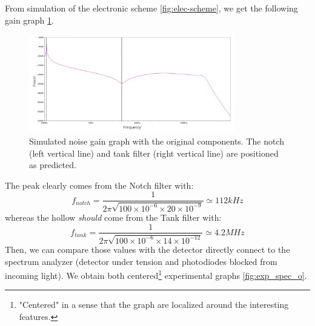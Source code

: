 \documentclass[11pt]{report}
\begin{document}
From simulation of the electronic scheme \ref{fig:elec-scheme}, we get the following gain graph \ref{fig:noise_gain_opamp_original}. 

\begin{figure}[h!]
\centering
\includegraphics[width=0.8\textwidth]{noise_gain_opamp_original}
\caption{Simulated noise gain graph with the original components. The notch (left vertical line) and tank filter (right vertical line) are positioned as predicted.}
\label{fig:noise_gain_opamp_original}
\end{figure}

The peak clearly comes from the Notch filter with:
\begin{equation}
\label{peak_notch_original}
f_{notch} = \frac{1}{2\pi\sqrt{100 \times 10^{-6} \times 20 \times 10^{-9}}} \simeq 112 kHz
\end{equation}
whereas the hollow \textit{should} come from the Tank filter with:
\begin{equation}
f_{tank} = \frac{1}{2\pi\sqrt{100 \times 10^{-6} \times 14 \times 10^{-12}}} \simeq 4.2MHz
\end{equation}
Then, we can compare those values with the detector directly connect to the spectrum analyzer (detector under tension and photodiodes blocked from incoming light). We obtain both centered\footnote{"Centered" in a sense that the graph are localized around the interesting features.} experimental graphs \ref{fig:exp_spec_o}.
\end{document}
